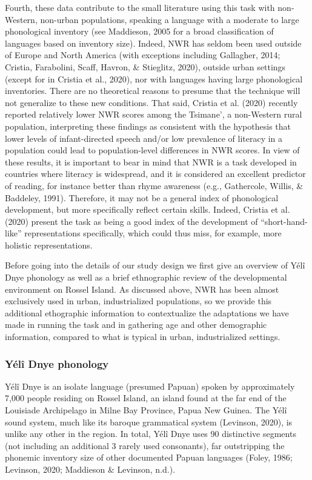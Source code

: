 \documentclass[english,,man,floatsintext]{apa6}
\begin{document}
Fourth, these data contribute to the small literature using this task with non-Western, non-urban populations, speaking a language with a moderate to large phonological inventory (see Maddieson, 2005 for a broad classification of languages based on inventory size). Indeed, NWR has seldom been used outside of Europe and North America (with exceptions including Gallagher, 2014; Cristia, Farabolini, Scaff, Havron, \& Stieglitz, 2020), outside urban settings (except for in Cristia et al., 2020), nor with languages having large phonological inventories. There are no theoretical reasons to presume that the technique will not generalize to these new conditions. That said, Cristia et al. (2020) recently reported relatively lower NWR scores among the Tsimane', a non-Western rural population, interpreting these findings as consistent with the hypothesis that lower levels of infant-directed speech and/or low prevalence of literacy in a population could lead to population-level differences in NWR scores. In view of these results, it is important to bear in mind that NWR is a task developed in countries where literacy is widespread, and it is considered an excellent predictor of reading, for instance better than rhyme awareness (e.g., Gathercole, Willis, \& Baddeley, 1991). Therefore, it may not be a general index of phonological development, but more specifically reflect certain skills. Indeed, Cristia et al. (2020) present the task as being a good index of the development of \enquote{short-hand-like} representations specifically, which could thus miss, for example, more holistic representations.

Before going into the details of our study design we first give an overview of Yélî Dnye phonology as well as a brief ethnographic review of the developmental environment on Rossel Island. As discussed above, NWR has been almost exclusively used in urban, industrialized populations, so we provide this additional ethographic information to contextualize the adaptations we have made in running the task and in gathering age and other demographic information, compared to what is typical in urban, industrialized settings.

\hypertarget{yuxe9luxee-dnye-phonology}{%
\subsubsection{Yélî Dnye phonology}\label{yuxe9luxee-dnye-phonology}}

Yélî Dnye is an isolate language (presumed Papuan) spoken by approximately 7,000 people residing on Rossel Island, an island found at the far end of the Louisiade Archipelago in Milne Bay Province, Papua New Guinea. The Yélî sound system, much like its baroque grammatical system (Levinson, 2020), is unlike any other in the region. In total, Yélî Dnye uses 90 distinctive segments (not including an additional 3 rarely used consonants), far outstripping the phonemic inventory size of other documented Papuan languages (Foley, 1986; Levinson, 2020; Maddieson \& Levinson, n.d.).
\end{document}
